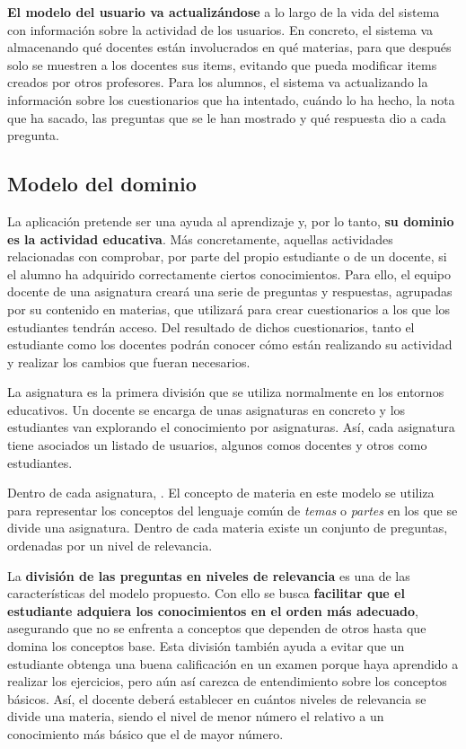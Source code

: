 \textbf{El modelo del usuario va actualizándose }a lo largo de la vida del sistema con información sobre la actividad de los usuarios. En concreto, el sistema va almacenando qué docentes están involucrados en qué materias, para que después solo se muestren a los docentes sus items, evitando que pueda modificar items creados por otros profesores. Para los alumnos, el sistema va actualizando la información sobre los cuestionarios que ha intentado, cuándo lo ha hecho, la nota que ha sacado, las preguntas que se le han mostrado y qué respuesta dio a cada pregunta.

\subsection{Modelo del dominio}

La aplicación pretende ser una ayuda al aprendizaje y, por lo tanto, \textbf{su dominio es la actividad educativa}. Más concretamente, aquellas actividades relacionadas con comprobar, por parte del propio estudiante o de un docente, si el alumno ha adquirido correctamente ciertos conocimientos. Para ello, el equipo docente de una asignatura creará una serie de preguntas y respuestas, agrupadas por su contenido en materias, que utilizará para crear cuestionarios a los que los estudiantes tendrán acceso. Del resultado de dichos cuestionarios, tanto el estudiante como los docentes podrán conocer cómo están realizando su actividad y realizar los cambios que fueran necesarios.

La asignatura es la primera división que se utiliza normalmente en los entornos educativos. Un docente se encarga de unas asignaturas en concreto y los estudiantes van explorando el conocimiento por asignaturas. Así, cada asignatura tiene asociados un listado de usuarios, algunos comos docentes y otros como estudiantes. 

Dentro de cada asignatura, . El concepto de materia en este modelo se utiliza para representar los conceptos del lenguaje común de \emph{temas} o \emph{partes} en los que se divide una asignatura. Dentro de cada materia existe un conjunto de preguntas, ordenadas por un nivel de relevancia.

La \textbf{división de las preguntas en niveles de relevancia} es una de las características del modelo propuesto. Con ello se busca \textbf{facilitar que el estudiante adquiera los conocimientos en el orden más adecuado}, asegurando que no se enfrenta a conceptos que dependen de otros hasta que domina los conceptos base. Esta división también ayuda a evitar que un estudiante obtenga una buena calificación en un examen porque haya aprendido a realizar los ejercicios, pero aún así carezca de entendimiento sobre los conceptos básicos. Así, el docente deberá establecer en cuántos niveles de relevancia se divide una materia, siendo el nivel de menor número el relativo a un conocimiento más básico que el de mayor número.

